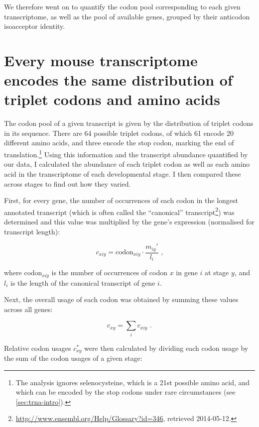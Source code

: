 We therefore went on to quantify the codon pool corresponding to each given
transcriptome, as well as the pool of available \trna genes, grouped by their
anticodon isoacceptor identity.

\section{Every mouse  transcriptome encodes the same distribution of
triplet codons and amino acids}

The codon pool of a given \mrna transcript is given by the distribution of
triplet codons in its sequence. There are \num{64} possible triplet codons, of
which \num{61} encode \num{20} different amino acids, and three encode the stop
codon, marking the end of translation.\footnote{The analysis ignores
selenocysteine, which is a \num{21}st possible amino acid, and which can be
encoded by the stop codons  under rare circumstances (see
\cref{sec:trna-intro}).} Using this information and the transcript abundance
quantified by our \rnaseq data, I calculated the abundance of each triplet codon
as well as each amino acid in the transcriptome of each developmental stage. I
then compared these across stages to find out how they varied.

First, for every gene, the number of occurrences of each codon in the longest
annotated transcript (which is often called the “canonical”
transcript\footnote{\url{http://www.ensembl.org/Help/Glossary?id=346}, retrieved
2014-05-12.}) was determined and this value was multiplied by the gene’s
expression (normalised for transcript length):

\begin{equation}
    c_{xiy} = \text{codon}_{xiy} \cdot \frac{m_{iy}'}{l_{i}} \text{\ ,}
\end{equation}

where \(\text{codon}_{xiy}\) is the number of occurrences of codon \(x\) in gene
\(i\) at stage \(y\), and \(l_i\) is the length of the canonical transcript of
gene \(i\).

Next, the overall usage of each codon was obtained by summing these values
across all genes:

\begin{equation}
    c_{xy} = \sum_i c_{xiy} \text{\ .}
\end{equation}

Relative codon usages \(c_{xy}^*\) were then calculated by dividing each codon
usage by the sum of the codon usages of a given stage:

